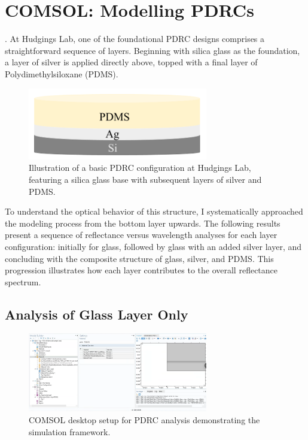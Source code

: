 \section{COMSOL: Modelling PDRCs}.
At Hudgings Lab, one of the foundational PDRC designs comprises a straightforward sequence of layers. Beginning with silica glass as the foundation, a layer of silver is applied directly above, topped with a final layer of Polydimethylsiloxane (PDMS).

\begin{figure}[H]
  \centering
  \includegraphics[width=0.7\textwidth]{Chapters/Figures/Chapter 4 Figures/PDRC Layout.png}
  \caption{Illustration of a basic PDRC configuration at Hudgings Lab, featuring a silica glass base with subsequent layers of silver and PDMS.}
  \label{fig:PDRC-configuration-Hudgings-Lab}
\end{figure}

To understand the optical behavior of this structure, I systematically approached the modeling process from the bottom layer upwards. The following results present a sequence of reflectance versus wavelength analyses for each layer configuration: initially for glass, followed by glass with an added silver layer, and concluding with the composite structure of glass, silver, and PDMS. This progression illustrates how each layer contributes to the overall reflectance spectrum.

\subsection{Analysis of Glass Layer Only}

\begin{figure}[H]
  \centering
  \includegraphics[width=0.7\textwidth]{Chapters/Figures/Chapter 4 Figures/COMSOL Desktop Layout for PDRC Analysis.png}
  \caption{COMSOL desktop setup for PDRC analysis demonstrating the simulation framework.}
  \label{fig:COMSOL-desktop-PDRC-setup}
\end{figure}

